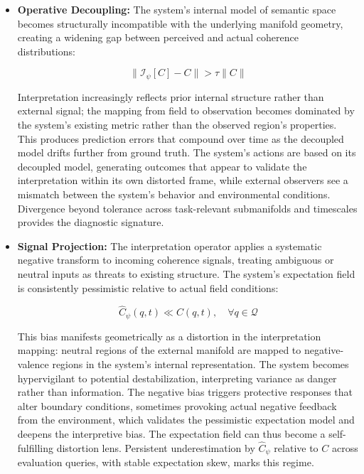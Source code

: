\begin{itemize}

    \item \textbf{Operative Decoupling:} The system's internal model of semantic space becomes structurally incompatible with the underlying manifold geometry, creating a widening gap between perceived and actual coherence distributions:

    \begin{equation}
    \|\mathcal{I}_{\psi}[C] - C\| > \tau \|C\|
    \end{equation}

    Interpretation increasingly reflects prior internal structure rather than external signal; the mapping from field to observation becomes dominated by the system's existing metric rather than the observed region's properties. This produces prediction errors that compound over time as the decoupled model drifts further from ground truth. The system's actions are based on its decoupled model, generating outcomes that appear to validate the interpretation within its own distorted frame, while external observers see a mismatch between the system's behavior and environmental conditions. Divergence beyond tolerance across task-relevant submanifolds and timescales provides the diagnostic signature.
    
    \item \textbf{Signal Projection:} The interpretation operator applies a systematic negative transform to incoming coherence signals, treating ambiguous or neutral inputs as threats to existing structure. The system's expectation field is consistently pessimistic relative to actual field conditions:

    \begin{equation}
    \hat{C}_{\psi}(q,t) \ll C(q,t), \quad \forall q \in \mathcal{Q}
    \end{equation}

    This bias manifests geometrically as a distortion in the interpretation mapping: neutral regions of the external manifold are mapped to negative-valence regions in the system's internal representation. The system becomes hypervigilant to potential destabilization, interpreting variance as danger rather than information. The negative bias triggers protective responses that alter boundary conditions, sometimes provoking actual negative feedback from the environment, which validates the pessimistic expectation model and deepens the interpretive bias. The expectation field can thus become a self-fulfilling distortion lens. Persistent underestimation by \(\hat{C}_{\psi}\) relative to \(C\) across evaluation queries, with stable expectation skew, marks this regime.


\end{itemize}
